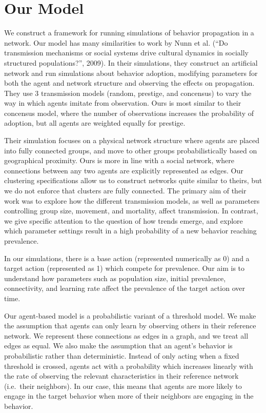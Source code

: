 \documentclass[11pt]{article}
\begin{document}
\hypertarget{our-model}{%
\section{Our Model}\label{our-model}}

We construct a framework for running simulations of behavior propagation
in a network. Our model has many similarities to work by Nunn et al.
(``Do transmission mechanisms or social systems drive cultural dynamics
in socially structured populations?'', 2009). In their simulations, they
construct an artificial network and run simulations about behavior
adoption, modifying parameters for both the agent and network structure
and observing the effects on propagation. They use 3 transmission models
(random, prestige, and concensus) to vary the way in which agents
imitate from observation. Ours is most similar to their concensus model,
where the number of observations increases the probability of adoption,
but all agents are weighted equally for prestige.

Their simulation focuses on a physical network structure where agents
are placed into fully connected groups, and move to other groups
probabilistically based on geographical proximity. Ours is more in line
with a social network, where connections between any two agents are
explicitly represented as edges. Our clustering specifications allow us
to construct networks quite similar to theirs, but we do not enforce
that clusters are fully connected. The primary aim of their work was to
explore how the different transmission models, as well as parameters
controlling group size, movement, and mortality, affect transmission. In
contrast, we give specific attention to the question of how trends
emerge, and explore which parameter settings result in a high
probability of a new behavior reaching prevalence.

In our simulations, there is a base action (represented numerically as
0) and a target action (represented as 1) which compete for prevalence.
Our aim is to understand how parameters such as population size, initial
prevalence, connectivity, and learning rate affect the prevalence of the
target action over time.

Our agent-based model is a probabilistic variant of a threshold model.
We make the assumption that agents can only learn by observing others in
their reference network. We represent these connections as edges in a
graph, and we treat all edges as equal. We also make the assumption that
an agent's behavior is probabilistic rather than deterministic. Instead
of only acting when a fixed threshold is crossed, agents act with a
probability which increases linearly with the rate of observing the
relevant characteristics in their reference network (i.e.~their
neighbors). In our case, this means that agents are more likely to
engage in the target behavior when more of their neighbors are engaging
in the behavior.
\end{document}
